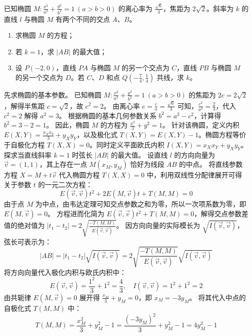 \begin{example}
已知椭圆 \(M: \frac{x^2}{a^2} + \frac{y^2}{b^2} = 1\ (a>b>0)\) 的离心率为 \(\frac{\sqrt{6}}{3}\)，焦距为 \(2\sqrt{2}\)。斜率为 \(k\) 的直线 \(l\) 与椭圆 \(M\) 有两个不同的交点 \(A\)、\(B\)。\begin{enumerate}
    \item[(1)] 求椭圆 \(M\) 的方程；
    \item[(2)] 若 \(k=1\)，求 \(|AB|\) 的最大值；
    \item[(3)] 设 \(P(-2,0)\)，直线 \(PA\) 与椭圆 \(M\) 的另一个交点为 \(C\)，直线 \(PB\) 与椭圆 \(M\) 的另一个交点为 \(D\)。若 \(C\)、\(D\) 和点 \(Q\left(-\frac{7}{4},\frac{1}{4}\right)\) 共线，求 \(k\)。\end{enumerate}
\end{example}
\begin{solution}
先求椭圆的基本参数。
已知椭圆 $M: \frac{x^2}{a^2} + \frac{y^2}{b^2} = 1\ (a>b>0)$ 的焦距为 $2c = 2\sqrt{2}$，解得半焦距 $c = \sqrt{2}$，故 $c^2 = 2$。
由离心率 $e = \frac{c}{a} = \frac{\sqrt{6}}{3}$ 可知，$\frac{c^2}{a^2} = \frac{2}{3}$，代入 $c^2 = 2$ 解得 $a^2 = 3$。
根据椭圆的基本几何参数关系 $b^2 = a^2 - c^2$，计算得 $b^2 = 3 - 2 = 1$。
因此，椭圆 $M$ 的方程为 $\frac{x^2}{3} + y^2 = 1$。
针对该椭圆，定义内积 $E(X, Y) = \frac{x_X x_Y}{3} + y_X y_Y$，以及极化式 $T(X, Y) = E(X, Y) - 1$。椭圆方程等价于自极化方程 $T(X, X) = 0$。同时定义平面欧氏内积 $I(X, Y) = x_X x_Y + y_X y_Y$。\\
探求当直线斜率 $k=1$ 时弦长 $|AB|$ 的最大值。
设直线 $l$ 的方向向量为 $\vec{v} = (1, 1)$，其上存在一点 $M(x_M, y_M)$ 恰好为线段 $AB$ 的中点。
将直线参数方程 $X = M + t\vec{v}$ 代入椭圆方程 $T(X, X) = 0$ 中，利用双线性分配律展开可得关于参数 $t$ 的一元二次方程：
\[ E(\vec{v}, \vec{v}) t^2 + 2E(M, \vec{v}) t + T(M, M) = 0 \]
由于点 $M$ 为中点，由韦达定理可知交点参数之和为零，所以一次项系数为零，即 $E(M, \vec{v}) = 0$。
方程进而化简为 $E(\vec{v}, \vec{v}) t^2 + T(M, M) = 0$，解得交点参数差值的绝对值为 $|t_1 - t_2| = 2\sqrt{\frac{-T(M, M)}{E(\vec{v}, \vec{v})}}$。
因方向向量的实际模长为 $\sqrt{I(\vec{v}, \vec{v})}$，弦长可表示为：
\[ |AB| = |t_1 - t_2| \sqrt{I(\vec{v}, \vec{v})} = 2\sqrt{\frac{-T(M, M)}{E(\vec{v}, \vec{v})}} \sqrt{I(\vec{v}, \vec{v})} \]
将方向向量代入极化内积与欧氏内积中：
\[ E(\vec{v}, \vec{v}) = \frac{1^2}{3} + 1^2 = \frac{4}{3}, \quad I(\vec{v}, \vec{v}) = 1^2 + 1^2 = 2 \]
由共轭律 $E(M, \vec{v}) = 0$ 展开得 $\frac{x_M}{3} + y_M = 0$，即 $x_M = -3y_M$。
将其代入中点的自极化式 $T(M, M)$ 中：
\[ T(M, M) = \frac{x_M^2}{3} + y_M^2 - 1 = \frac{(-3y_M)^2}{3} + y_M^2 - 1 = 4y_M^2 - 1 \]

\end{solution}
